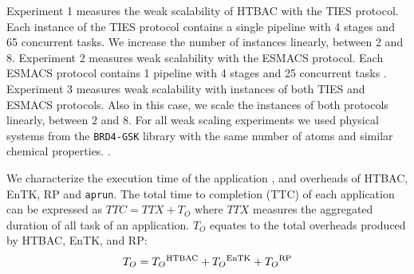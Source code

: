 Experiment 1 measures the weak scalability of HTBAC with the TIES protocol.
Each instance of the TIES protocol contains a single pipeline with 4 stages
and 65 concurrent tasks. We increase the number of instances linearly,
between 2 and 8. Experiment 2 measures weak scalability with the ESMACS
protocol. Each ESMACS protocol contains 1 pipeline with 4 stages and 25
concurrent tasks . Experiment 3 measures weak scalability
with instances of both TIES and ESMACS protocols. Also in this case, we scale
the instances of both protocols linearly, between 2 and 8. For all weak
scaling experiments we used  physical systems
from the \texttt{BRD4-GSK} library with the same number of atoms and similar
chemical properties. .


We characterize the execution time of the application ,
and overheads of HTBAC, EnTK, RP and \texttt{aprun}.  The total time to
completion (TTC) of each application    can be
expressed as $TTC = TTX + T_{O}$ where \(TTX\) measures the aggregated
duration of all task of an application.
 $T_{O}$ equates to the total overheads produced by HTBAC, EnTK, and
RP: $$T_{O} = T_{O}\textsuperscript{HTBAC} + T_{O}\textsuperscript{EnTK} +
T_{O}\textsuperscript{RP}$$ 



